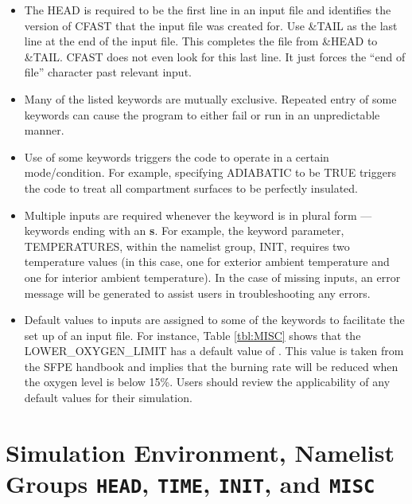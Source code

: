 \begin{itemize}
\item The {\ct HEAD} is required to be the first line in an input file and identifies the version of CFAST that the input file was created for. Use {\ct \&TAIL} as the last line at the end of the input file. This completes the file from {\ct \&HEAD} to {\ct \&TAIL}. CFAST does not even look for this last line. It just forces the “end of file” character past relevant input.
\item Many of the listed keywords are mutually exclusive. Repeated entry of some keywords can cause the program to either fail or run in an unpredictable manner.
\item Use of some keywords triggers the code to operate in a certain mode/condition. For example, specifying {\ct ADIABATIC} to be {\ct TRUE} triggers the code to treat all compartment surfaces to be perfectly insulated.
\item Multiple inputs are required whenever the keyword is in plural form --- keywords ending with an \textbf{s}. For example, the keyword parameter, {\ct TEMPERATURES}, within the namelist group, {\ct INIT}, requires two temperature values (in this case, one for exterior ambient temperature and one for interior ambient temperature). In the case of missing inputs, an error message will be generated to assist users in troubleshooting any errors.
\item Default values to inputs are assigned to some of the keywords to facilitate the set up of an input file. For instance, Table \ref{tbl:MISC} shows that the {\ct LOWER\_OXYGEN\_LIMIT} has a default value of {}. This value is taken from the SFPE handbook \cite{SFPE:2003} and implies that the burning rate will be reduced when the oxygen level is below 15\%. Users should review the applicability of any default values for their simulation.
\end{itemize}


\clearpage

\section{Simulation Environment, Namelist Groups \texorpdfstring{{\tt HEAD}}{HEAD}, \texorpdfstring{{\tt TIME}}{TIME}, \texorpdfstring{{\tt INIT}}{INIT}, and  \texorpdfstring{{\tt MISC}}{MISC}}

